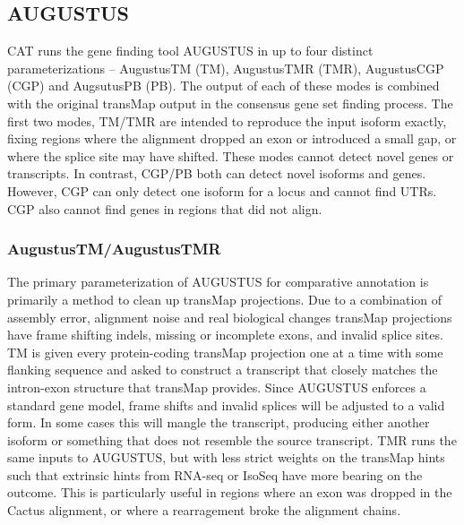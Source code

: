 \documentclass[fleqn,10pt]{wlscirep}
\begin{document}
\subsection*{AUGUSTUS}
	CAT runs the gene finding tool AUGUSTUS in up to four distinct parameterizations -- AugustusTM (TM), AugustusTMR (TMR), AugustusCGP (CGP) and AugsutusPB (PB). The output of each of these modes is combined with the original transMap output in the consensus gene set finding process. The first two modes, TM/TMR are intended to reproduce the input isoform exactly, fixing regions where the alignment dropped an exon or introduced a small gap, or where the splice site may have shifted. These modes cannot detect novel genes or transcripts. In contrast, CGP/PB both can detect novel isoforms and genes. However, CGP can only detect one isoform for a locus and cannot find UTRs. CGP also cannot find genes in regions that did not align. 
    
\subsubsection*{AugustusTM/AugustusTMR}
	The primary parameterization of AUGUSTUS for comparative annotation is primarily a method to clean up transMap projections. Due to a combination of assembly error, alignment noise and real biological changes transMap projections have frame shifting indels, missing or incomplete exons, and invalid splice sites. TM is given every protein-coding transMap projection one at a time with some flanking sequence and asked to construct a transcript that closely matches the intron-exon structure that transMap provides. Since AUGUSTUS enforces a standard gene model, frame shifts and invalid splices will be adjusted to a valid form. In some cases this will mangle the transcript, producing either another isoform or something that does not resemble the source transcript. TMR runs the same inputs to AUGUSTUS, but with less strict weights on the transMap hints such that extrinsic hints from RNA-seq or IsoSeq have more bearing on the outcome. This is particularly useful in regions where an exon was dropped in the Cactus alignment, or where a rearragement broke the alignment chains.
    
\end{document}

